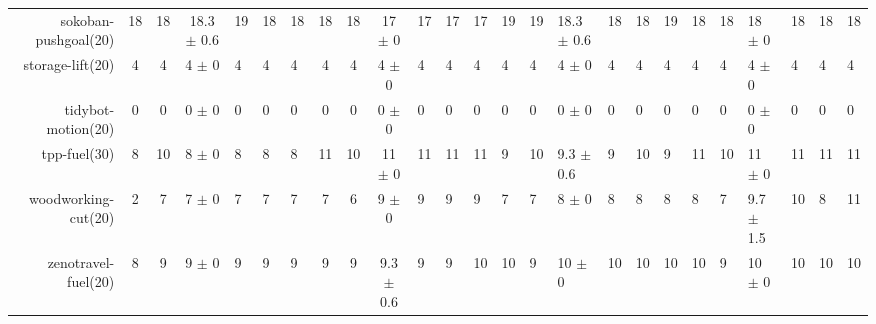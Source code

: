 \begin{center}
\begin{tabular}{|rcccHHH|cccHHHHHHHHHHHHHHH|}
sokoban-pushgoal(20) & 18 & 18 & 18.3 \(\pm\) 0.6 & 19 & 18 & 18 & 18 & 18 & 17 \(\pm\) 0 & 17 & 17 & 17 & 19 & 19 & 18.3 \(\pm\) 0.6 & 18 & 18 & 19 & 18 & 18 & 18 \(\pm\) 0 & 18 & 18 & 18\\
storage-lift(20) & 4 & 4 & 4 \(\pm\) 0 & 4 & 4 & 4 & 4 & 4 & 4 \(\pm\) 0 & 4 & 4 & 4 & 4 & 4 & 4 \(\pm\) 0 & 4 & 4 & 4 & 4 & 4 & 4 \(\pm\) 0 & 4 & 4 & 4\\
tidybot-motion(20) & 0 & 0 & 0 \(\pm\) 0 & 0 & 0 & 0 & 0 & 0 & 0 \(\pm\) 0 & 0 & 0 & 0 & 0 & 0 & 0 \(\pm\) 0 & 0 & 0 & 0 & 0 & 0 & 0 \(\pm\) 0 & 0 & 0 & 0\\
tpp-fuel(30) & 8 & 10 & 8 \(\pm\) 0 & 8 & 8 & 8 & 11 & 10 & 11 \(\pm\) 0 & 11 & 11 & 11 & 9 & 10 & 9.3 \(\pm\) 0.6 & 9 & 10 & 9 & 11 & 10 & 11 \(\pm\) 0 & 11 & 11 & 11\\
woodworking-cut(20) & 2 & 7 & 7 \(\pm\) 0 & 7 & 7 & 7 & 7 & 6 & 9 \(\pm\) 0 & 9 & 9 & 9 & 7 & 7 & 8 \(\pm\) 0 & 8 & 8 & 8 & 8 & 7 & 9.7 \(\pm\) 1.5 & 10 & 8 & 11\\
zenotravel-fuel(20) & 8 & 9 & 9 \(\pm\) 0 & 9 & 9 & 9 & 9 & 9 & 9.3 \(\pm\) 0.6 & 9 & 9 & 10 & 10 & 9 & 10 \(\pm\) 0 & 10 & 10 & 10 & 10 & 9 & 10 \(\pm\) 0 & 10 & 10 & 10\\
\end{tabular}
\end{center}
